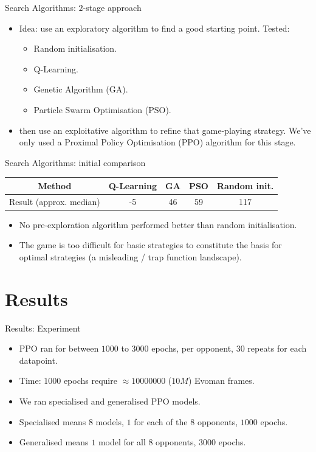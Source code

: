 \documentclass[boxes]{beamer}
\begin{document}
\begin{frame}{Search Algorithms: $2$-stage approach}
  \begin{itemize}
  \item Idea: use an exploratory algorithm to find a good starting point. \pause Tested:
    \begin{itemize}
    \item Random initialisation.
    \item Q-Learning.
    \item Genetic Algorithm (GA).
    \item Particle Swarm Optimisation (PSO).
    \end{itemize}
    \pause
  \item then use an exploitative algorithm to refine that game-playing strategy. We've only used a Proximal Policy Optimisation (PPO) algorithm for this stage.
  \end{itemize}
\end{frame}

\begin{frame}{Search Algorithms: initial comparison}
  \begin{tabular}{|c|c|c|c|c|} \hline
    Method                  & Q-Learning & GA & PSO & Random init.\\ \hline
    Result (approx. median) & -5         & 46 &  59 & 117    \\ \hline
  \end{tabular}
  \pause
  \begin{itemize}
  \item No pre-exploration algorithm performed better than random initialisation.
  \item The game is too difficult for basic strategies to constitute the basis for optimal strategies (a misleading / trap function landscape).
  \end{itemize}
\end{frame}

\section{Results}
\begin{frame}{Results: Experiment}
  \begin{itemize}
  \item PPO ran for between $1000$ to $3000$ epochs, per opponent, $30$ repeats for each datapoint.
  \item Time: $1000$ epochs require $\approx 10000000$ ($10M$) Evoman frames.
  \item We ran specialised and generalised PPO models.
  \item Specialised means $8$ models, $1$ for each of the $8$ opponents, $1000$ epochs.
  \item Generalised means $1$ model for all $8$ opponents, $3000$ epochs.
  \end{itemize}
\end{frame}
\end{document}
